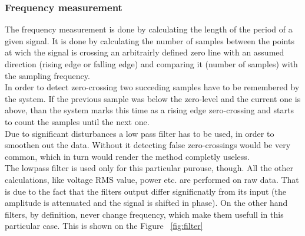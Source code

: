 \subsubsection{Frequency measurement}
The frequency measurement is done by calculating the length of the period of a given signal. It is done by calculating the number of samples between the points at wich the signal is crossing an arbitrairly defined zero line with an assumed direction (rising edge or falling edge) and comparing it (number of samples) with the sampling frequency.\\
In order to detect zero-crossing two succeding samples have to be remembered by the system. If the previous sample was below the zero-level and the current one is above, than the system marks this time as a rising edge zero-crossing and starts to count the samples until the next one.\\
Due to significant disturbances a low pass filter has to be used, in order to smoothen out the data. Without it detecting false zero-crossings would be very common, which in turn would render the method completly useless.\\
The lowpass filter is used only for this particular purouse, though. All the other calculations, like voltage RMS value, power etc. are performed on raw data. That is due to the fact that the filters output differ significnatly from its input (the amplitude is attenuated and the signal is shifted in phase). On the other hand filters, by definition, never change frequency, which make them usefull in this particular case. This is shown on the Figure ~\ref{fig:filter}

